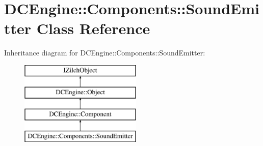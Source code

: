 \hypertarget{classDCEngine_1_1Components_1_1SoundEmitter}{\section{D\-C\-Engine\-:\-:Components\-:\-:Sound\-Emitter Class Reference}
\label{classDCEngine_1_1Components_1_1SoundEmitter}
}
Inheritance diagram for D\-C\-Engine\-:\-:Components\-:\-:Sound\-Emitter\-:\begin{figure}[H]
\begin{center}
\leavevmode
\includegraphics[height=4.000000cm]{classDCEngine_1_1Components_1_1SoundEmitter}
\end{center}
\end{figure}
